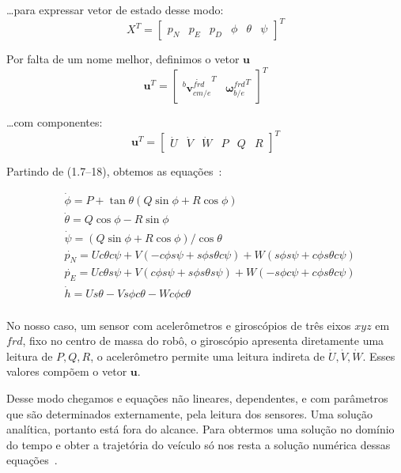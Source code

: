\ldots para expressar vetor de estado desse modo:
\begin{equation*}
    X^{T} = \begin{bmatrix} p_{N} &  p_{E} & p_{D} & \phi & \theta & \psi \end{bmatrix}^{T}
\end{equation*}

Por falta de um nome melhor, definimos o vetor \(\mathbf{u}\)
\begin{equation*}
    \mathbf{u}^{T} = \begin{bmatrix} {^{b}\dot{{\mathbf{v}}^{frd}_{cm/e}}^{T}} & {\mathbf{\omega}^{frd}_{b/e}}^{T} \end{bmatrix}^{T}
\end{equation*}

\ldots com componentes:
\begin{equation*}
    \mathbf{u}^{T} = \begin{bmatrix} \dot{U} & \dot{V} & \dot{W} & P & Q & R \end{bmatrix}^{T}
\end{equation*}

Partindo de (1.7--18), obtemos as equações~\cite{Stevens2016}:

\begin{align*}\tag{Table 2.5-1}
    &\dot{\phi}   =  P + \tan{\theta} \left( Q \sin{\phi} + R \cos{\phi} \right) \\
    &\dot{\theta} =  Q \cos{\phi} - R \sin{\phi} \\
    &\dot{\psi}   =  \left( Q \sin{\phi} + R \cos{\phi} \right) / \cos{\theta} \\
    &\dot{p_{N}}  =  U c \theta c \psi  + V ( -c \phi s \psi + s \phi s \theta c \psi ) + W ( s \phi s \psi + c \phi s \theta c \psi) \\
    &\dot{p_{E}}  =  U c \theta s \psi  + V (  c \phi s \psi + s \phi s \theta s \psi ) + W (-s \phi c \psi + c \phi s \theta c \psi) \\
    &\dot{h}      =  U s \theta - V s \phi c \theta - W c \phi c \theta \\
\end{align*}

No nosso caso, um sensor com acelerômetros e giroscópios de três eixos \(xyz\) em \(frd\), fixo no centro de massa do robô, o giroscópio apresenta diretamente uma leitura de \( P, Q, R\), o acelerômetro permite uma leitura indireta de \( \dot{U}, \dot{V}, \dot{W}\). Esses valores compõem o vetor \(\mathbf{u}\).

Desse modo chegamos e equações não lineares, dependentes, e com parâmetros que são determinados externamente, pela leitura dos sensores. Uma solução analítica, portanto está fora do alcance. Para obtermos uma solução no domínio do tempo e obter a trajetória do veículo só nos resta a solução numérica dessas equações~\cite{Stevens2016}.


